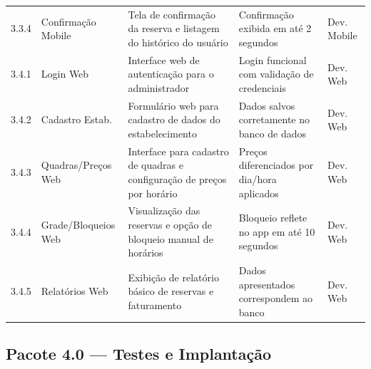 \documentclass[12pt,a4paper,oneside]{report}
\begin{document}
\begin{longtable}{c p{2.2cm} p{3.2cm} p{3.5cm} p{2.2cm}}
3.3.4 & Confirmação Mobile & Tela de confirmação da reserva e listagem do histórico do usuário & Confirmação exibida em até 2 segundos & Dev. Mobile \\
3.4.1 & Login Web & Interface web de autenticação para o administrador & Login funcional com validação de credenciais & Dev. Web \\
3.4.2 & Cadastro Estab. & Formulário web para cadastro de dados do estabelecimento & Dados salvos corretamente no banco de dados & Dev. Web \\
3.4.3 & Quadras/Preços Web & Interface para cadastro de quadras e configuração de preços por horário & Preços diferenciados por dia/hora aplicados & Dev. Web \\
3.4.4 & Grade/Bloqueios Web & Visualização das reservas e opção de bloqueio manual de horários & Bloqueio reflete no app em até 10 segundos & Dev. Web \\
3.4.5 & Relatórios Web & Exibição de relatório básico de reservas e faturamento & Dados apresentados correspondem ao banco & Dev. Web \\
\end{longtable}

\subsection{Pacote 4.0 --- Testes e Implantação}
\end{document}
